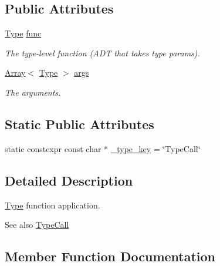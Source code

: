 \subsection*{Public Attributes}
\begin{DoxyCompactItemize}
\item 
\hyperlink{classtvm_1_1Type}{Type} \hyperlink{classtvm_1_1TypeCallNode_ad411852baaa607438122219b714773ea}{func}
\begin{DoxyCompactList}\small\item\em The type-\/level function (A\+DT that takes type params). \end{DoxyCompactList}\item 
\hyperlink{classtvm_1_1Array}{Array}$<$ \hyperlink{classtvm_1_1Type}{Type} $>$ \hyperlink{classtvm_1_1TypeCallNode_a2e5fb370089941ae6fae26a110ad3783}{args}
\begin{DoxyCompactList}\small\item\em The arguments. \end{DoxyCompactList}\end{DoxyCompactItemize}
\subsection*{Static Public Attributes}
\begin{DoxyCompactItemize}
\item 
static constexpr const char $\ast$ \hyperlink{classtvm_1_1TypeCallNode_a40818692649116129f929d01b46fb2a4}{\+\_\+type\+\_\+key} = \char`\"{}Type\+Call\char`\"{}
\end{DoxyCompactItemize}


\subsection{Detailed Description}
\hyperlink{classtvm_1_1Type}{Type} function application. 

\begin{DoxySeeAlso}{See also}
\hyperlink{classtvm_1_1TypeCall}{Type\+Call} 
\end{DoxySeeAlso}


\subsection{Member Function Documentation}
